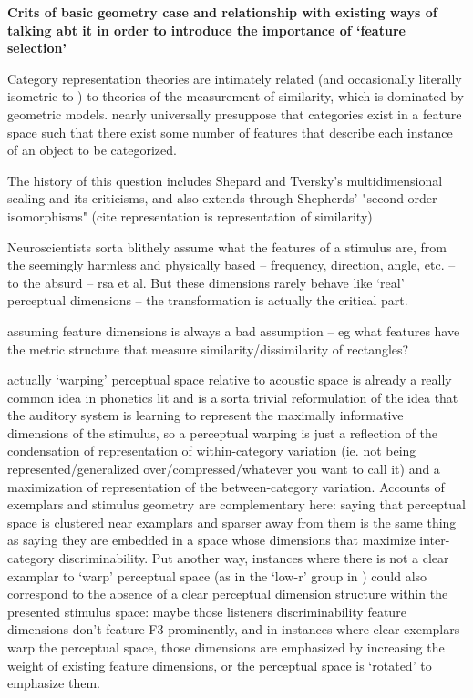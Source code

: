 \begin{multicols}{2}
\textbf{Crits of basic geometry case and relationship with existing ways of talking abt it in order to introduce the importance of `feature selection'}


Category representation theories are intimately related (and occasionally literally isometric to \cite{Edelman1998}) to theories of the measurement of similarity, which is dominated by geometric models\cite{Tversky1977}. nearly universally presuppose that categories exist in a feature space such that there exist some number of features that describe each instance of an object to be categorized.

The history of this question includes Shepard and Tversky's multidimensional scaling and its criticisms, and also extends through Shepherds' "second-order isomorphisms" (cite representation is representation of similarity)

Neuroscientists sorta blithely assume what the features of a stimulus are, from the seemingly harmless and physically based -- frequency, direction, angle, etc. -- to the absurd -- rsa et al. But these dimensions rarely behave like `real' perceptual dimensions \cite{krantzSimilarityRectanglesAnalysis1975a} -- the transformation is actually the critical part. 

assuming feature dimensions is always a bad assumption -- eg what features have the metric structure that measure similarity/dissimilarity of rectangles? \cite{krantzSimilarityRectanglesAnalysis1975a}

actually `warping' perceptual space relative to acoustic space is already a really common idea in phonetics lit\cite{iversonInfluencesPhoneticIdentification1996,kuhlNewViewLanguage2000} and is a sorta trivial reformulation of the idea that the auditory system is learning to represent the maximally informative dimensions of the stimulus, so a perceptual warping is just a reflection of the condensation of representation of within-category variation (ie. not being represented/generalized over/compressed/whatever you want to call it) and a maximization of representation of the between-category variation. Accounts of exemplars and stimulus geometry are complementary here: saying that perceptual space is clustered near examplars and sparser away from them is the same thing as saying they are embedded in a space whose dimensions that maximize inter-category discriminability. Put another way, instances where there is not a clear examplar to `warp' perceptual space (as in the `low-r' group in \cite{iversonInfluencesPhoneticIdentification1996}) could also correspond to the absence of a clear perceptual dimension structure within the presented stimulus space: maybe those listeners discriminability feature dimensions don't feature F3 prominently, and in instances where clear exemplars warp the perceptual space, those dimensions are emphasized by increasing the weight of existing feature dimensions, or the perceptual space is `rotated' to emphasize them. 


\end{multicols}
